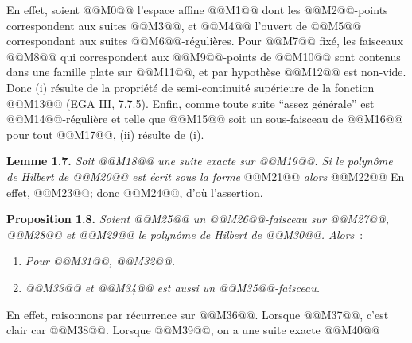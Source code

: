 
En
effet, soient @@M0@@ l'espace affine @@M1@@ dont les @@M2@@-points correspondent aux suites @@M3@@, et @@M4@@ l'ouvert de @@M5@@ correspondant aux suites @@M6@@-régulières. Pour @@M7@@ fixé, les faisceaux @@M8@@ qui correspondent aux @@M9@@-points de @@M10@@ sont contenus dans une famille plate sur @@M11@@, et par hypothèse @@M12@@ est non-vide. Donc (i) résulte de la propriété de semi-continuité supérieure de la fonction @@M13@@ (EGA III, 7.7.5). Enfin, comme toute suite ``assez générale'' est @@M14@@-régulière et telle que @@M15@@ soit un sous-faisceau de @@M16@@ pour tout @@M17@@, (ii) résulte de (i).

\textbf{Lemme 1.7.} \emph{Soit @@M18@@ une suite exacte sur @@M19@@. Si le polynôme de Hilbert de @@M20@@ est écrit sous la forme}
@@M21@@
\emph{alors}
@@M22@@
En effet, @@M23@@; donc @@M24@@, d'où l'assertion.

\textbf{Proposition 1.8.} \emph{Soient @@M25@@ un @@M26@@-faisceau sur @@M27@@, @@M28@@ et @@M29@@ le polynôme de Hilbert de @@M30@@. Alors}~:
\begin{enumerate}[label=(\roman*)]
\item \emph{Pour @@M31@@, @@M32@@.}
\item \emph{@@M33@@ et @@M34@@ est aussi un @@M35@@-faisceau.}
\end{enumerate}
En effet, raisonnons par récurrence sur @@M36@@. Lorsque @@M37@@, c'est clair car @@M38@@. Lorsque @@M39@@, on a une suite exacte
@@M40@@
